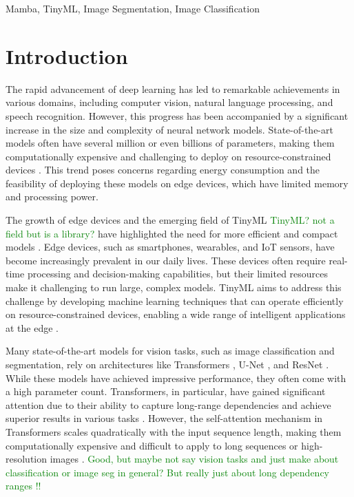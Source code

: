 \documentclass[conference]{IEEEtran}
\newcommand{\gr}[1]{\textcolor{green}{#1}}
\begin{document}
\begin{IEEEkeywords}
    Mamba, TinyML, Image Segmentation, Image Classification
\end{IEEEkeywords}

\section{Introduction}
The rapid advancement of deep learning has led to remarkable achievements in various domains, including computer vision, natural language processing, and speech recognition. However, this progress has been accompanied by a significant increase in the size and complexity of neural network models. State-of-the-art models often have several million or even billions of parameters, making them computationally expensive and challenging to deploy on resource-constrained devices \cite{brown2020language, dosovitskiy2021image}. This trend poses concerns regarding energy consumption and the feasibility of deploying these models on edge devices, which have limited memory and processing power.

The growth of edge devices and the emerging field of TinyML \gr{TinyML? not a field but is a library?} have highlighted the need for more efficient and compact models \cite{warden2019tinyml}. Edge devices, such as smartphones, wearables, and IoT sensors, have become increasingly prevalent in our daily lives. These devices often require real-time processing and decision-making capabilities, but their limited resources make it challenging to run large, complex models. TinyML aims to address this challenge by developing machine learning techniques that can operate efficiently on resource-constrained devices, enabling a wide range of intelligent applications at the edge \cite{banbury2021benchmarking}.

Many state-of-the-art models for vision tasks, such as image classification and segmentation, rely on architectures like Transformers \cite{dosovitskiy2021image}, U-Net \cite{ronneberger2015unet}, and ResNet \cite{he2016deep}. While these models have achieved impressive performance, they often come with a high parameter count. Transformers, in particular, have gained significant attention due to their ability to capture long-range dependencies and achieve superior results in various tasks \cite{vaswani2017attention}. However, the self-attention mechanism in Transformers scales quadratically with the input sequence length, making them computationally expensive and difficult to apply to long sequences or high-resolution images \cite{choromanski2020rethinking}. \gr{Good, but maybe not say vision tasks and just make about classification or image seg in general? But really just about long dependency ranges !!}
\end{document}
